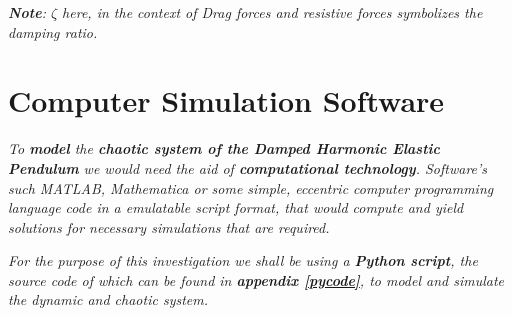     \textit{\textbf{Note}: $\zeta$ here, in the context of Drag forces and resistive forces symbolizes the damping ratio.}
            
\section{{Computer Simulation Software}}
        
    \textit{To \textbf{model} the \textbf{chaotic system of the Damped Harmonic Elastic Pendulum} we would need the aid of \textbf{computational technology}. Software's such MATLAB, Mathematica or some simple, eccentric computer programming language code in a emulatable script format, that would compute and yield solutions for necessary simulations that are required.}
    
    \textit{For the purpose of this investigation we shall be using a \textbf{Python script}, the source code of which can be found in \textbf{appendix \ref{pycode}}, to model and simulate the dynamic and chaotic system.}
        
        


